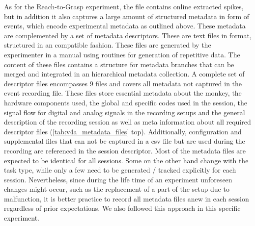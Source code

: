 As for the Reach-to-Grasp experiment, the  file contains online extracted spikes, but in addition it also captures a large amount of structured metadata in form of events, which encode experimental metadata as outlined above.
These metadata are complemented by a set of metadata descriptors. These are text files in  format, structured in an  compatible fashion. These files are generated by the experimenter in a manual using  routines for generation of repetitive data. The content of these files contains a structure for metadata branches that can be merged and integrated in an hierarchical  metadata collection. A complete set of descriptor files encompasses $9$  files and covers all metadata not captured in the event recording file. These  files store essential metadata about the monkey, the hardware components used, the global and specific codes used in the session, the signal flow for digital and analog signals in the recording setups and the general description of the recording session as well as meta information about all required descriptor files (\cref{tab:v4a_metadata_files} top). Additionally, configuration and supplemental files that can not be captured in a csv file but are used during the recording are referenced in the session descriptor. Most of the metadata files are expected to be identical for all sessions. Some on the other hand change with the task type, while only a few need to be generated / tracked explicitly for each session. Nevertheless, since during the life time of an experiment unforeseen changes might occur, such as the replacement of a part of the setup due to malfunction, it is better practice to record all metadata files anew in each session regardless of prior expectations. We also followed this approach in this specific experiment.

